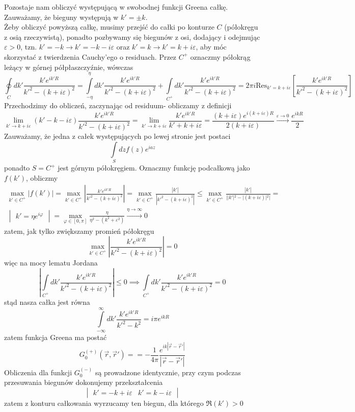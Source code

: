 \documentclass[a4paper,12pt]{article}
\begin{document}
    		Pozostaje nam obliczyć występującą w swobodnej funkcji Greena całkę. Zauważamy, że bieguny występują w $k' = \pm k$.\\
    		Żeby obliczyć powyższą całkę, musimy przejść do całki po konturze $C$ (półokręgu z osią rzeczywistą), ponadto pozbywamy się 
    		biegunów z osi, dodający i odejmując $\varepsilon>0$, tzn. $k' = -k \to k' = -k-i\varepsilon$ oraz 
    		$k' = k \to k' = k+i\varepsilon$, aby móc skorzystać z twierdzenia Cauchy'ego o residuach. Przez $C^+$ oznaczmy
    		półokrąg leżący w górnej półpłaszczyźnie, wówczas
    		$$
    			\oint\limits_{C}dk' \frac{k'e^{ik'R}}{k'^2-(k+i\varepsilon)^2} = \int\limits_{-\eta}^\eta dk' \frac{k'e^{ik'R}}{k'^2-(k+i\varepsilon)^2} + 
    			\int\limits_{C^+} dk' \frac{k'e^{ik'R}}{k'^2-(k+i\varepsilon)^2} = 2\pi i \mathrm{Res}_{k'=k+i\varepsilon}\left[\frac{k'e^{ik'R}}{k'^2-(k+i\varepsilon)^2}\right]
    		$$
    		Przechodzimy do obliczeń, zaczynając od residuum- obliczamy z definicji
    		$$
    			\lim\limits_{k'\to k+i\varepsilon} (k'-k-i\varepsilon) \frac{k'e^{ik'R}}{k'^2-(k+i\varepsilon)^2} = \lim\limits_{k'\to k+i\varepsilon} \frac{k'e^{ik'R}}{k'+k+i\varepsilon} =
    			\frac{(k+i\varepsilon)e^{i(k+i\varepsilon)R}}{2(k+i\varepsilon)} \overset{\varepsilon\to 0}{\to} \frac{e^{ikR}}{2}
    		$$
    		Zauważamy, że jedna z całek występujących po lewej stronie jest postaci
    		$$
    			\int\limits_{S}dz f(z) e^{iaz}
    		$$
    		ponadto $S=C^+$ jest górnym półokręgiem. Oznaczmy funkcję podcałkową jako $f(k')$, obliczmy
    		$$
    		\begin{gathered}
    			\max\limits_{k'\in C^+}|f(k')| = \max\limits_{k'\in C^+}\left|\frac{k'e^{ik'R}}{k'^2-(k+i\varepsilon)^2}  \right| 
    			=\max\limits_{k'\in C^+}\frac{|k'|}{|k'^2-(k+i\varepsilon)^2|} \leq \max\limits_{k'\in C^+}\frac{|k'|}{||k'|^2-|(k+i\varepsilon)|^2|} =\\
    			\begin{vmatrix}
    				k' = \eta e^{i\varphi}
    			\end{vmatrix}
    			= \max\limits_{\varphi\in[0,\pi]}\frac{\eta}{\eta^2-(k^2+\varepsilon^2)} \overset{\eta\to \infty}{\to} 0
    		\end{gathered}
    		$$
    		zatem, jak tylko zwiększamy promień półokręgu
    		$$
    			\max\limits_{k'\in C^+} \left|\frac{k'e^{ik'R}}{k'^2-(k+i\varepsilon)^2}\right| = 0
    		$$
    		więc na mocy lematu Jordana 
    		$$
    			\left|\int\limits_{C^+}dk'\frac{k'e^{ik'R}}{k'^2-(k+i\varepsilon)^2}\right| \leq 0 \implies \int\limits_{C^+}dk'\frac{k'e^{ik'R}}{k'^2-(k+i\varepsilon)^2} = 0
    		$$
    		stąd nasza całka jest równa
    		$$
    			\int\limits_{-\infty}^\infty dk' \frac{k'e^{ik'R}}{k'^2-k^2} = i\pi e^{ikR}
    		$$
    		zatem funkcja Greena ma postać
    		$$
    			G_0^{(+)}(\vec{r},\vec{r}') = = -\frac{1}{4\pi}\frac{e^{ik|\vec{r}-\vec{r}'|}}{|\vec{r}-\vec{r}'|}
    		$$
    		Obliczenia dla funkcji $G_0^{(-)}$ są prowadzone identycznie, przy czym podczas przesuwania biegunów dokonujemy przekształcenia
    		$$
    			\begin{vmatrix}
    			k' = -k +i\varepsilon & k' = k-i\varepsilon 
    			\end{vmatrix}
    		$$
    		zatem z konturu całkowania wyrzucamy ten biegun, dla którego $\Re(k')>0$
\end{document}

